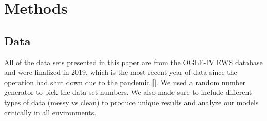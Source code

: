 \documentclass{article}
\begin{document}
\section{Methods}
\subsection{Data}

All of the data sets presented in this paper are from the OGLE-IV EWS database and were finalized in 2019, which is the most recent year of data since the operation had shut down due to the pandemic [\cite{OGLE}]. We used a random number generator to pick the data set numbers. We also made sure to include different types of data (messy vs clean) to produce unique results and analyze our models critically in all environments.
\end{document}
